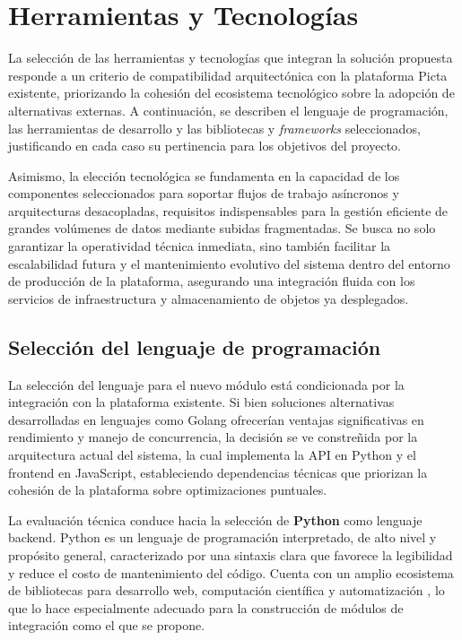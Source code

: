 \section{Herramientas y Tecnologías}

La selección de las herramientas y tecnologías que integran la solución propuesta responde a un 
criterio de compatibilidad arquitectónica con la plataforma Picta existente, priorizando la cohesión 
del ecosistema tecnológico sobre la adopción de alternativas externas. A continuación, se describen 
el lenguaje de programación, las herramientas de desarrollo y las bibliotecas y \textit{frameworks} 
seleccionados, justificando en cada caso su pertinencia para los objetivos del proyecto.

Asimismo, la elección tecnológica se fundamenta en la capacidad de los componentes seleccionados para 
soportar flujos de trabajo asíncronos y arquitecturas desacopladas, requisitos indispensables para la 
gestión eficiente de grandes volúmenes de datos mediante subidas fragmentadas. Se busca no solo garantizar 
la operatividad técnica inmediata, sino también facilitar la escalabilidad futura y el mantenimiento evolutivo 
del sistema dentro del entorno de producción de la plataforma, asegurando una integración fluida con los servicios 
de infraestructura y almacenamiento de objetos ya desplegados.

\subsection{Selección del lenguaje de programación}

La selección del lenguaje para el nuevo módulo está condicionada por la integración con la plataforma
existente. Si bien soluciones alternativas desarrolladas en lenguajes como Golang ofrecerían ventajas
significativas en rendimiento y manejo de concurrencia, la decisión se ve constreñida por la
arquitectura actual del sistema, la cual implementa la API en Python y el frontend en JavaScript,
estableciendo dependencias técnicas que priorizan la cohesión de la plataforma sobre optimizaciones
puntuales.

La evaluación técnica conduce hacia la selección de \textbf{Python} como lenguaje backend. Python
es un lenguaje de programación interpretado, de alto nivel y propósito general, caracterizado por
una sintaxis clara que favorece la legibilidad y reduce el costo de mantenimiento del código.
Cuenta con un amplio ecosistema de bibliotecas para desarrollo web, computación científica y
automatización \citep{Pressman2021}, lo que lo hace especialmente adecuado para la construcción
de módulos de integración como el que se propone.

